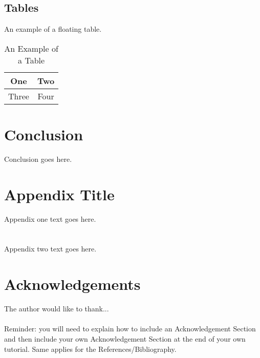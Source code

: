 \documentclass[12pt,journal,compsoc]{IEEEtran}
\begin{document}
\subsection{Tables}
An example of a floating table.

%
\begin{table}[h]
\renewcommand{\arraystretch}{1.3}
\caption{An Example of a Table}
\label{table_example}
\centering
\begin{tabular}{|c||c|}
\hline
One & Two\\
\hline
Three & Four\\
\hline
\end{tabular}
\end{table}


\section{Conclusion}
Conclusion goes here.

\appendices
\section{Appendix Title}
Appendix one text goes here.

\section{}
Appendix two text goes here.


\section*{Acknowledgements}

The author would like to thank...\\ \\

Reminder: you will need to explain how to include an Acknowledgement Section and then include your own Acknowledgement Section at the end of your own tutorial. Same applies for the References/Bibliography.
\end{document}
